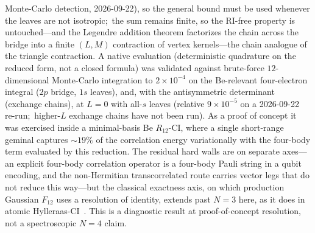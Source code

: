 \documentclass[aps,pra,twocolumn,superscriptaddress,longbibliography]{revtex4-2}
\begin{document}
Monte-Carlo detection, 2026-09-22), so the general bound must be used whenever
the leaves are not isotropic;\ the sum remains finite, so the RI-free property
is untouched---and the Legendre addition theorem factorizes the
chain across the bridge into a finite $(L,M)$ contraction of vertex kernels---the
chain analogue of the triangle contraction.  A native evaluation (deterministic
quadrature on the reduced form, not a closed formula) was validated against
brute-force $12$-dimensional Monte-Carlo integration to $2\times10^{-4}$ on the
Be-relevant four-electron integral ($2p$ bridge, $1s$ leaves), and, with the
antisymmetric determinant (exchange chains), at $L=0$ with all-$s$ leaves
(relative $9\times10^{-5}$ on a 2026-09-22 re-run;\ higher-$L$ exchange chains
have not been run).  As a proof of concept it was exercised inside a
minimal-basis Be $R_{12}$-CI, where a single short-range geminal captures
$\sim\!19\%$ of the correlation energy variationally with the four-body term
evaluated by this reduction.  The residual hard walls are on separate
axes---an explicit four-body correlation operator is a four-body Pauli string
in a qubit encoding, and the non-Hermitian transcorrelated route carries
vector legs that do not reduce this way---but the classical exactness axis, on
which production Gaussian $F_{12}$ uses a resolution of identity, extends past
$N=3$ here, as it does in atomic Hylleraas-CI~\cite{King2014}.  This is a diagnostic result at proof-of-concept
resolution, not a spectroscopic $N=4$ claim.
\end{document}
